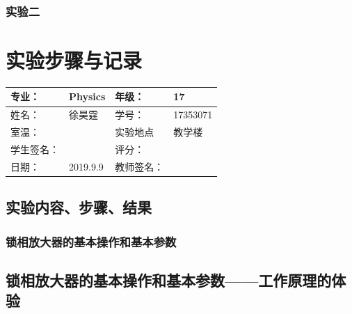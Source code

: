 \documentclass[11pt,a4paper]{ctexart}
\begin{document}
\subsubsection{实验二}

\newpage
\section{实验步骤与记录}
\begin{tabular}{|p{8em}|p{8em}|p{8em}|p{8em}|}
	\hline 
	专业：     &Physics       &年级：      & 17     \\
	\hline
	姓名：& 徐昊霆 &学号：&17353071  \\
	\hline
	室温：&                    &实验地点 & 教学楼 \\
	\hline	
	学生签名： & & 评分： & \\
	\hline
	日期： & 2019.9.9 & 教师签名：&  \\
	\hline
\end{tabular}
\subsection{实验内容、步骤、结果}
\subsubsection{锁相放大器的基本操作和基本参数}
	\subsection{锁相放大器的基本操作和基本参数——工作原理的体验}
\end{document}
